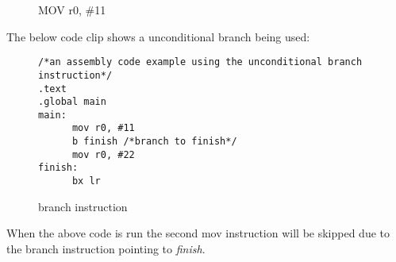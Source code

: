 \documentclass[11pt]{report}
\begin{document}
\begin{center}
\begin{figure}[H] 
\caption{MOV r0, \#11}
\end{figure}
\end{center}

\begin{onehalfspace}
The below code clip shows a unconditional branch being used:
\end{onehalfspace}
\begin{figure}[H]
\begin{verbatim}
/*an assembly code example using the unconditional branch instruction*/
.text
.global main
main:
      mov r0, #11
      b finish /*branch to finish*/
      mov r0, #22
finish:
      bx lr
\end{verbatim}
\caption{branch instruction}
\end{figure}

\begin{onehalfspace}
When the above code is run the second mov instruction will be skipped due to the branch instruction pointing to \textit{finish}.
\end{onehalfspace}
\end{document}
